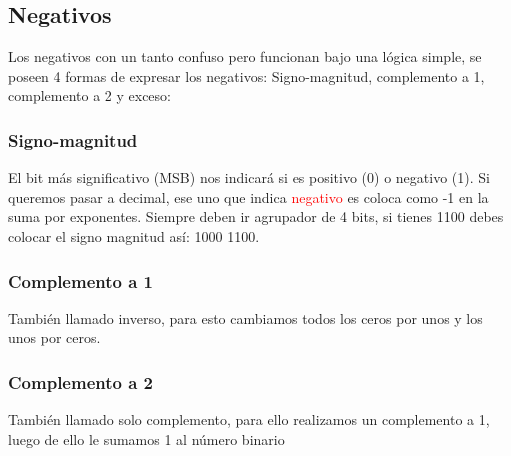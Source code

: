 \documentclass[
	12pt, %
	fleqn, %
	a4paper, %
	oneside, %
]{LegrandOrangeBook}
\begin{document}
\subsection{Negativos}
Los negativos con un tanto confuso pero funcionan bajo una lógica simple, se poseen 4 formas de expresar los negativos: Signo-magnitud, complemento a 1, complemento a 2 y exceso:
\subsubsection{Signo-magnitud}
El bit más significativo (MSB) nos indicará si es positivo (0) o negativo (1). Si queremos pasar a decimal, ese uno que indica \textcolor{red}{negativo} es coloca como -1 en la suma por exponentes. Siempre deben ir agrupador de 4 bits, si tienes 1100 debes colocar el signo magnitud así: 1000 1100.
\subsubsection{Complemento a 1}
También llamado inverso, para esto cambiamos todos los ceros por unos y los unos por ceros.
\subsubsection{Complemento a 2}
También llamado solo complemento, para ello realizamos un complemento a 1, luego de ello le sumamos 1 al número binario
\end{document}
